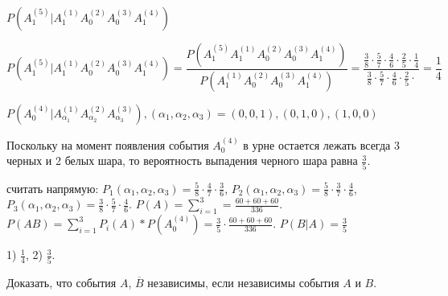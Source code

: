 \begin{subtask}{1}
  $P(A_1^{(5)} | A_1^{(1)} A_0^{(2)} A_0^{(3)} A_1^{(4)})$ 
\end{subtask}

\begin{solution}
\begin{equation*}
  P(A_1^{(5)} | A_1^{(1)} A_0^{(2)} A_0^{(3)} A_1^{(4)}) = \frac{P\left(A_1^{(5)} A_1^{(1)} A_0^{(2)} A_0^{(3)} A_1^{(4)}\right)}
  {P\left(A_1^{(1)} A_0^{(2)} A_0^{(3)} A_1^{(4)}\right)} = \frac{\frac{3}{8} \cdot \frac{5}{7} \cdot \frac{4}{6}\cdot \frac{2}{5}\cdot \frac{1}{4}}
  {\frac{3}{8} \cdot \frac{5}{7} \cdot \frac{4}{6}\cdot \frac{2}{5}\cdot} = \frac{1}{4}
\end{equation*}
\end{solution}


\begin{subtask}{2}
  $P(A_0^{(4)} | A_{\alpha_1}^{(1)} A_{\alpha_2}^{(2)} A_{\alpha_3}^{(3)}), \left(\alpha_1, \alpha_2, \alpha_3\right) =
  \left(0, 0, 1\right), \left(0, 1, 0\right), \left(1, 0, 0\right) $
\end{subtask}

\begin{solution}
  Поскольку на момент появления события $A_0^{(4)}$ в урне остается лежать всегда  3 черных и 2 белых
  шара, то вероятность выпадения черного шара равна $\frac{3}{5}$.

\medskip
{} считать напрямую: $P_1(\alpha_1, \alpha_2, \alpha_3) = \frac{5}{8} \cdot  \frac{4}{7} \cdot 
\frac{3}{6}$, $P_2(\alpha_1, \alpha_2, \alpha_3) = \frac{5}{8} \cdot \frac{3}{7} \cdot \frac{4}{6}$, 
$P_3(\alpha_1, \alpha_2, \alpha_3) = \frac{3}{8} \cdot  \frac{5}{7} \cdot \frac{4}{6}$. 
$P(A) = \sum_{i = 1}^3 = \frac{60 + 60 + 60}{336}$.  $P(AB) = \sum_{i = 1}^3 P_i(A) * P(A_0^{(4)}) = 
\frac{3}{5} \cdot \frac{60 + 60 + 60}{336}$. $P(B | A) = \frac{3}{5}$
\end{solution}

\begin{result}
1) $\frac{1}{4}$, 2) $\frac{3}{5}$.
\end{result}


\medskip
\begin{task}{5}
  Доказать, что события $A$, $\overline{B}$ независимы, если независимы события $A$ и $B$.
\end{task}

